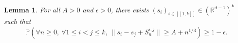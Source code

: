 \documentclass[a4paper, 11pt]{article}
\theoremstyle{plain}
\newtheorem{Lemma}[Theorem]{Lemma}
\theoremstyle{definition}
\newcommand{\R}{\mathbb{R}}
\renewcommand{\P}{\mathbb{P}}
\newcommand{\range}[2]{[\![#1,#2]\!]}
\numberwithin{equation}{section}
\begin{document}






\begin{Lemma}
    \label{lemma_kesten}
    For all $A>0$ and $\epsilon>0$, there exists $(s_i)_{i\in\range{1}{k}}\in(\R^{d-1})^k$ such that
        \[\P(\forall n\geq0,~\forall 1\leq i<j\leq k,~\|s_i-s_j+S_n^{i, j}\|\geq A+n^{1/3})\geq 1-\epsilon.\]

    
\end{Lemma}
\end{document}
